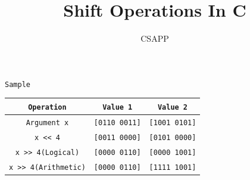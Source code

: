 \documentclass{article}
\title{Shift Operations In C}
\author{CSAPP}
\begin{document}
    \maketitle

    \small
    \texttt{Sample}
    \begin{center}
        \begin{tabular}{ccc}
            \texttt{Operation}          &   \texttt{Value 1}    & \texttt{Value 2}\\
            \midrule
            \texttt{Argument x}         &   \texttt{[0110~0011]} & \texttt{[1001~0101]}\\
            \texttt{x << 4}             &   \texttt{[0011~0000]} & \texttt{[0101~0000]}\\
            \texttt{x >> 4(Logical)}    &   \texttt{[0000~0110]} & \texttt{[0000~1001]}\\
            \texttt{x >> 4(Arithmetic)} &   \texttt{[0000~0110]} & \texttt{[1111~1001]}\\ 
        \end{tabular}
    \end{center}
\end{document}

